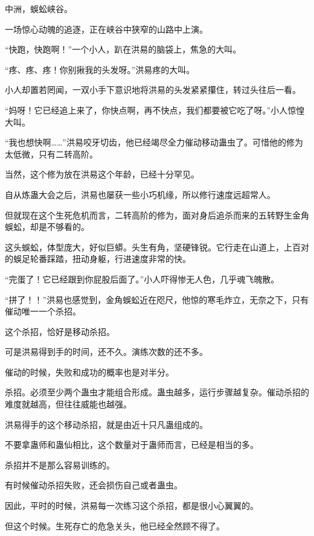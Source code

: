 
\begin{this_body}

中洲，蜈蚣峡谷。

一场惊心动魄的追逐，正在峡谷中狭窄的山路中上演。

“快跑，快跑啊！”一个小人，趴在洪易的脑袋上，焦急的大叫。

“疼、疼、疼！你别揪我的头发呀。”洪易疼的大叫。

小人却置若罔闻，一双小手下意识地将洪易的头发紧紧攥住，转过头往后一看。

“妈呀！它已经追上来了，你快点啊，再不快点，我们都要被它吃了呀。”小人惊惶大叫。

“我也想快啊……”洪易咬牙切齿，他已经竭尽全力催动移动蛊虫了。可惜他的修为太低微，只有二转高阶。

当然，这个修为放在洪易这个年龄，已经十分罕见。

自从炼蛊大会之后，洪易也屡获一些小巧机缘，所以修行速度远超常人。

但就现在这个生死危机而言，二转高阶的修为，面对身后追杀而来的五转野生金角蜈蚣，却是不够看的。

这头蜈蚣，体型庞大，好似巨蟒。头生有角，坚硬锋锐。它行走在山道上，上百对的蜈足轮番踩踏，扭动身躯，行进速度非常的快。

“完蛋了！它已经跟到你屁股后面了。”小人吓得惨无人色，几乎魂飞魄散。

“拼了！！”洪易也感觉到，金角蜈蚣近在咫尺，他惊的寒毛炸立，无奈之下，只有催动唯一一个杀招。

这个杀招，恰好是移动杀招。

可是洪易得到手的时间，还不久。演练次数的还不多。

催动的时候，失败和成功的概率也是对半分。

杀招。必须至少两个蛊虫才能组合形成。蛊虫越多，运行步骤越复杂。催动杀招的难度就越高，但往往威能也越强。

洪易得手的这个移动杀招，就是由近十只凡蛊组成的。

不要拿蛊师和蛊仙相比，这个数量对于蛊师而言，已经是相当的多。

杀招并不是那么容易训练的。

有时候催动杀招失败，还会损伤自己或者蛊虫。

因此，平时的时候，洪易每一次练习这个杀招，都是很小心翼翼的。

但这个时候。生死存亡的危急关头，他已经全然顾不得了。


\end{this_body}
